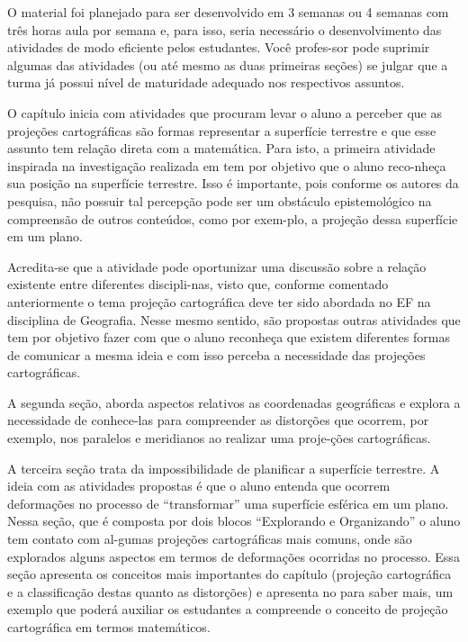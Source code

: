 \begin{apresentacao}
{O material foi planejado para ser desenvolvido em 3 semanas ou 4 semanas com três horas aula por semana e, para isso, seria necessário o desenvolvimento das atividades de modo eficiente pelos estudantes. Você  profes-sor pode suprimir  algumas das atividades (ou até mesmo as duas primeiras seções) se julgar que a turma já possui nível de maturidade adequado nos respectivos assuntos.

O capítulo inicia com atividades que procuram levar o aluno a perceber que as projeções cartográficas são formas representar a superfície terrestre e que esse assunto tem relação direta com a matemática. Para isto, a primeira atividade inspirada na investigação realizada em \cite{Nussbaum} tem por objetivo que o aluno reco-nheça sua posição na superfície terrestre. Isso é importante, pois conforme os autores da pesquisa, não possuir tal percepção pode ser um obstáculo epistemológico na compreensão de outros conteúdos, como por exem-plo, a projeção dessa superfície em um plano. 

Acredita-se que a atividade pode oportunizar uma discussão sobre a relação existente entre diferentes discipli-nas, visto que, conforme comentado anteriormente o tema projeção cartográfica deve ter sido abordada no EF na disciplina de Geografia. Nesse mesmo sentido, são propostas outras atividades que tem por objetivo fazer com que o aluno  reconheça que existem diferentes formas de comunicar a mesma ideia e com isso perceba a necessidade das projeções cartográficas. 

A segunda seção, aborda aspectos relativos as coordenadas geográficas e explora a necessidade de conhece-las para compreender as distorções que ocorrem, por exemplo, nos paralelos e meridianos ao realizar uma  proje-ções cartográficas.

A terceira seção trata da impossibilidade de planificar a superfície terrestre. A ideia com as atividades propostas é que o aluno entenda que ocorrem deformações no processo de “transformar” uma superfície esférica em um plano. Nessa seção, que é composta por dois blocos “Explorando e Organizando” o aluno tem contato com al-gumas projeções cartográficas mais comuns, onde são explorados alguns aspectos em termos de deformações ocorridas no processo. Essa seção apresenta os conceitos mais  importantes do capítulo (projeção cartográfica e a classificação destas quanto as distorções) e apresenta no para saber mais, um exemplo que poderá auxiliar os estudantes a compreende o conceito de projeção cartográfica em termos matemáticos. 

}
\end{apresentacao}
